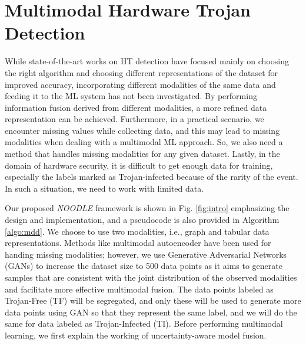 \section*{Multimodal Hardware Trojan
Detection}
\label{sec:solution}
While state-of-the-art works on HT detection have focused mainly on choosing the right algorithm and choosing different representations of the dataset for improved accuracy, incorporating different modalities of the same data and feeding it to the ML system has not been investigated. By performing information fusion derived from different modalities, a more refined data representation can be achieved. Furthermore, in a practical scenario, we encounter missing values while collecting data, and this may lead to missing modalities when dealing with a multimodal ML approach. So, we also need a method that handles missing modalities for any given dataset. Lastly, in the domain of hardware security, it is difficult to get enough data for training, especially the labels marked as Trojan-infected because of the rarity of the event. In such a situation, we need to work with limited data.


Our proposed \textit{NOODLE} framework is shown in Fig. \ref{fig:intro} emphasizing the design and implementation, and a pseudocode is also provided in Algorithm \ref{algo:mdd}. We choose to use two modalities, i.e., graph and tabular data representations. Methods like multimodal autoencoder \cite{jaques2017multimodal} have been used for handing missing modalities; however, we use Generative Adversarial Networks (GANs) \cite{creswell2018generative} to increase the dataset size to 500 data points as it aims to generate samples that are consistent with the joint distribution of the observed modalities and facilitate more effective multimodal fusion. The data points labeled as Trojan-Free (TF) will be segregated, and only these will be used to generate more data points using GAN so that they represent the same label, and we will do the same for data labeled as Trojan-Infected (TI). Before performing multimodal learning, we first explain the working of uncertainty-aware model fusion.


